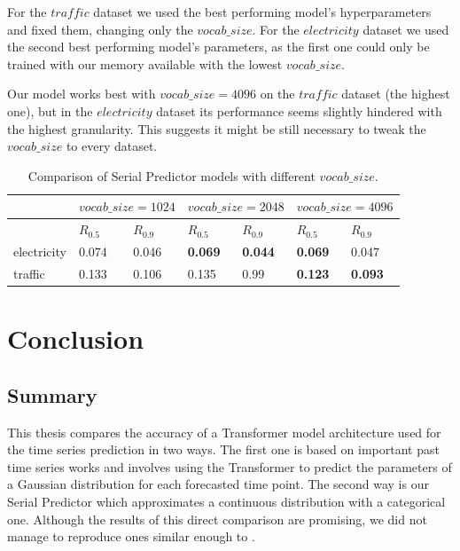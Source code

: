 \documentclass[en]{pracamgr}
\begin{document}
	For the $traffic$ dataset we used the best performing model's hyperparameters and fixed them, changing only the $vocab\_size$. For the $electricity$ dataset we used the second best performing model's parameters, as the first one could only be trained with our memory available with the lowest $vocab\_size$. 
	
	
	Our model works best with $vocab\_size = 4096$ on the $traffic$ dataset (the highest one), but in the $electricity$ dataset its performance seems slightly hindered with the highest granularity. This suggests it might be still necessary to tweak the $vocab\_size$ to every dataset.
	
	\begin{table}[h]
		\begin{center}
			\begin{tabular}
				{ |p{2cm}|p{1.5cm}|p{1.5cm}||p{1.5cm}|p{1.5cm}||p{1.5cm}|p{1.5cm}|   }
				\hline
				& \multicolumn{2}{c||}{$vocab\_size=1024$} & \multicolumn{2}{|c|}{$vocab\_size=2048$} & \multicolumn{2}{|c|}{$vocab\_size=4096$} \\
				\hline
				& \hfil $R_{0.5}$ & \hfil $R_{0.9}$ & \hfil $R_{0.5}$ & \hfil $R_{0.9} $ & \hfil $R_{0.5}$ & \hfil $R_{0.9} $
				\\
				\hline
				electricity & \hfil 0.074   & \hfil 0.046    & \hfil \textbf{0.069} &   \hfil \textbf{0.044} & \hfil \textbf{0.069} &   \hfil 0.047 \\
				
				traffic &  \hfil 0.133 &   \hfil 0.106 & \hfil 0.135 &   \hfil 0.99 & \textbf{\hfil 0.123} &   \hfil \textbf{0.093} \\
				\hline
			\end{tabular}
			\caption{\label{tab:results}Comparison of Serial Predictor models with different $vocab\_size$.}
		\end{center}
	\end{table}
	
	
	\chapter{Conclusion}
	
	\section{Summary}
	
	This thesis compares the accuracy of a Transformer model architecture used for the time series prediction in two ways. The first one is based on important past time series works and involves using the Transformer to predict the parameters of a Gaussian distribution for each forecasted time point. The second way is our Serial Predictor which approximates a continuous distribution with a categorical one. Although the results of this direct comparison are promising, we did not manage to reproduce ones similar enough to  \cite{enhancing}.
	
\end{document}
